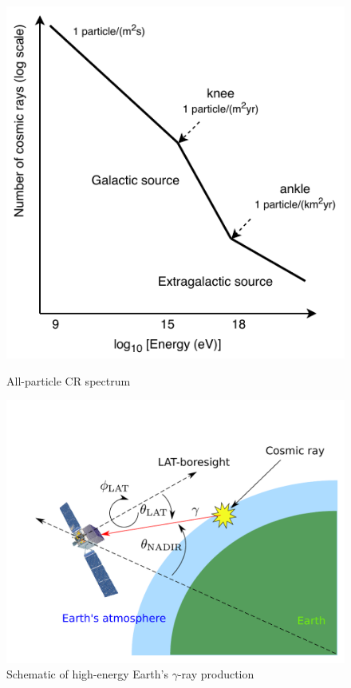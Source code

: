 \begin{figure}[h]
    \begin{minipage}{0.45\textwidth}
        \includegraphics[width=\textwidth]{img/CRs_overview}
        \caption{All-particle CR spectrum}
        \label{cr_knee_ankle}
    \end{minipage}\hspace{2pc}
    \begin{minipage}{0.55\textwidth}
        \includegraphics[width=\textwidth]{img/gamma_production_schematic}
        \caption{Schematic of high-energy Earth's $\gamma$-ray production}
        \label{gamma_production_schematic}
    \end{minipage} 
\end{figure}


